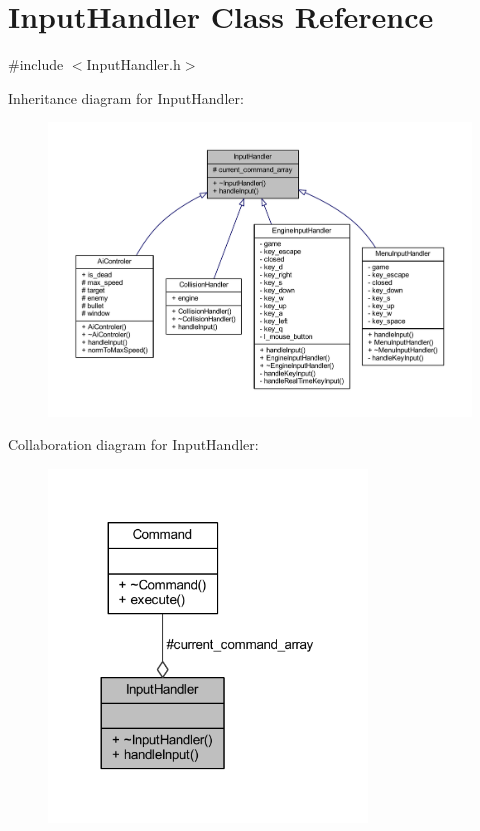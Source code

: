 \hypertarget{class_input_handler}{}\section{Input\+Handler Class Reference}
\label{class_input_handler}


{\ttfamily \#include $<$Input\+Handler.\+h$>$}



Inheritance diagram for Input\+Handler\+:
\nopagebreak
\begin{figure}[H]
\begin{center}
\leavevmode
\includegraphics[width=350pt]{class_input_handler__inherit__graph}
\end{center}
\end{figure}


Collaboration diagram for Input\+Handler\+:
\nopagebreak
\begin{figure}[H]
\begin{center}
\leavevmode
\includegraphics[width=240pt]{class_input_handler__coll__graph}
\end{center}
\end{figure}
